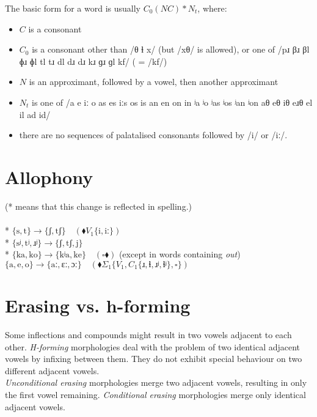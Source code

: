 \documentclass{book}
\begin{document}
The basic form for a word is usually $C_0(NC)*N_t$, where:

\begin{itemize}
  \item $C$ is a consonant
  \item $C_0$ is a consonant other than /θ ɬ x/ (but /xθ/ is allowed), or one of /pɹ βɹ βl ɸɹ ɸl tl tɹ dl dɹ dɹ kɹ ɡɹ ɡl kf/ ( = /kf/)
  \item $N$ is an approximant, followed by a vowel, then another approximant
  \item $N_t$ is one of /a e iː o as es iːs os is an en on in ʲa ʲo ʲas ʲos ʲan ʲon aθ eθ iθ eɹθ el il ad id/
  \item there are no sequences of palatalised consonants followed by /i/ or /iː/.
\end{itemize}

\section{Allophony}

(* means that this change is reflected in spelling.) \\
~\\
* $\{\text{s}, \text{t}\} \rightarrow \{\text{ʃ}, \text{tʃ}\} \quad(\blacklozenge V_1\{\text{i}, \text{iː}\})$ \\
* $\{\text{sʲ}, \text{tʲ}, \text{ɹʲ}\} \rightarrow \{\text{ʃ}, \text{tʃ}, \text{j}\}$ \\
* $\{\text{ka}, \text{ko}\} \rightarrow \{\text{kʲa}, \text{ke}\} \quad(\square \blacklozenge)$ (except in words containing  \emph{out}) \\
$\{\text{a}, \text{e}, \text{o}\} \rightarrow \{\text{aː}, \text{ɛː}, \text{ɔː}\} \quad(\blacklozenge \Sigma_1\{V_1, C_1\{\text{ɹ}, \text{ɬ}, \text{ɹʲ}, \text{ɬʲ}\}, \square\})$

\section{Erasing vs. h-forming}

Some inflections and compounds might result in two vowels adjacent to each other. \emph{H-forming} morphologies deal with the problem of two identical adjacent vowels by infixing  between them. They do not exhibit special behaviour on two different adjacent vowels. \\
\emph{Unconditional erasing} morphologies merge two adjacent vowels, resulting in only the first vowel remaining. \emph{Conditional erasing} morphologies merge only identical adjacent vowels.
\end{document}
